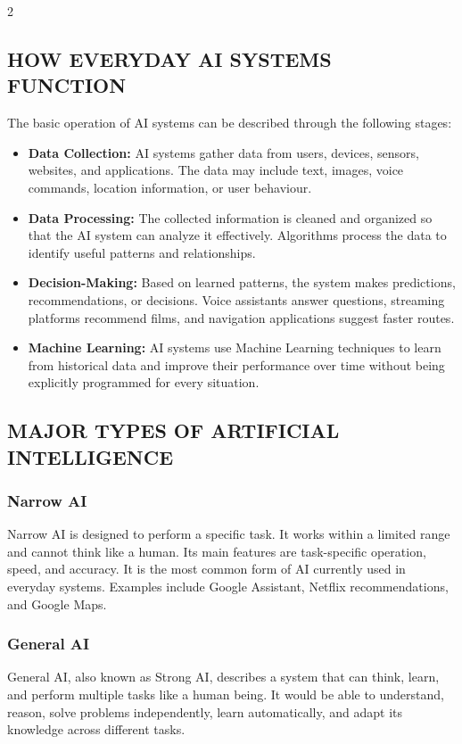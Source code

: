 \begin{multicols}{2}
  \subsection*{\centering\uppercase{How Everyday AI Systems Function}}
  The basic operation of AI systems can be described through the following stages:

  \begin{itemize}\justifying
    \item \textbf{Data Collection:} AI systems gather data from users, devices, sensors, websites, and applications. The data may include text, images, voice commands, location information, or user behaviour.
    \item \textbf{Data Processing:} The collected information is cleaned and organized so that the AI system can analyze it effectively. Algorithms process the data to identify useful patterns and relationships.
    \item \textbf{Decision-Making:} Based on learned patterns, the system makes predictions, recommendations, or decisions. Voice assistants answer questions, streaming platforms recommend films, and navigation applications suggest faster routes.
    \item \textbf{Machine Learning:} AI systems use Machine Learning techniques to learn from historical data and improve their performance over time without being explicitly programmed for every situation.
  \end{itemize}

  \subsection*{\centering\uppercase{Major Types of Artificial Intelligence}}
  \subsubsection*{Narrow AI}
  Narrow AI is designed to perform a specific task. It works within a limited range and cannot think like a human. Its main features are task-specific operation, speed, and accuracy. It is the most common form of AI currently used in everyday systems. Examples include Google Assistant, Netflix recommendations, and Google Maps.

  \subsubsection*{General AI}
  General AI, also known as Strong AI, describes a system that can think, learn, and perform multiple tasks like a human being. It would be able to understand, reason, solve problems independently, learn automatically, and adapt its knowledge across different tasks.


\end{multicols}
